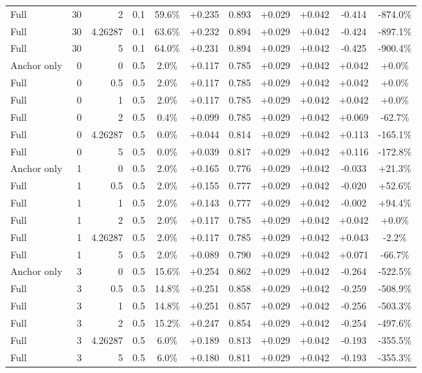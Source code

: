 \begin{table}[htbp]
\begin{tabular}{lrrrccccccc}
Full & 30 & 2 & 0.1 & 59.6\% & +0.235 & 0.893 & +0.029 & +0.042 & -0.414 & -874.0\% \\
Full & 30 & 4.26287 & 0.1 & 63.6\% & +0.232 & 0.894 & +0.029 & +0.042 & -0.424 & -897.1\% \\
Full & 30 & 5 & 0.1 & 64.0\% & +0.231 & 0.894 & +0.029 & +0.042 & -0.425 & -900.4\% \\
Anchor only & 0 & 0 & 0.5 & 2.0\% & +0.117 & 0.785 & +0.029 & +0.042 & +0.042 & +0.0\% \\
Full & 0 & 0.5 & 0.5 & 2.0\% & +0.117 & 0.785 & +0.029 & +0.042 & +0.042 & +0.0\% \\
Full & 0 & 1 & 0.5 & 2.0\% & +0.117 & 0.785 & +0.029 & +0.042 & +0.042 & +0.0\% \\
Full & 0 & 2 & 0.5 & 0.4\% & +0.099 & 0.785 & +0.029 & +0.042 & +0.069 & -62.7\% \\
Full & 0 & 4.26287 & 0.5 & 0.0\% & +0.044 & 0.814 & +0.029 & +0.042 & +0.113 & -165.1\% \\
Full & 0 & 5 & 0.5 & 0.0\% & +0.039 & 0.817 & +0.029 & +0.042 & +0.116 & -172.8\% \\
Anchor only & 1 & 0 & 0.5 & 2.0\% & +0.165 & 0.776 & +0.029 & +0.042 & -0.033 & +21.3\% \\
Full & 1 & 0.5 & 0.5 & 2.0\% & +0.155 & 0.777 & +0.029 & +0.042 & -0.020 & +52.6\% \\
Full & 1 & 1 & 0.5 & 2.0\% & +0.143 & 0.777 & +0.029 & +0.042 & -0.002 & +94.4\% \\
Full & 1 & 2 & 0.5 & 2.0\% & +0.117 & 0.785 & +0.029 & +0.042 & +0.042 & +0.0\% \\
Full & 1 & 4.26287 & 0.5 & 2.0\% & +0.117 & 0.785 & +0.029 & +0.042 & +0.043 & -2.2\% \\
Full & 1 & 5 & 0.5 & 2.0\% & +0.089 & 0.790 & +0.029 & +0.042 & +0.071 & -66.7\% \\
Anchor only & 3 & 0 & 0.5 & 15.6\% & +0.254 & 0.862 & +0.029 & +0.042 & -0.264 & -522.5\% \\
Full & 3 & 0.5 & 0.5 & 14.8\% & +0.251 & 0.858 & +0.029 & +0.042 & -0.259 & -508.9\% \\
Full & 3 & 1 & 0.5 & 14.8\% & +0.251 & 0.857 & +0.029 & +0.042 & -0.256 & -503.3\% \\
Full & 3 & 2 & 0.5 & 15.2\% & +0.247 & 0.854 & +0.029 & +0.042 & -0.254 & -497.6\% \\
Full & 3 & 4.26287 & 0.5 & 6.0\% & +0.189 & 0.813 & +0.029 & +0.042 & -0.193 & -355.5\% \\
Full & 3 & 5 & 0.5 & 6.0\% & +0.180 & 0.811 & +0.029 & +0.042 & -0.193 & -355.3\% \\

\end{tabular}
\end{table}
